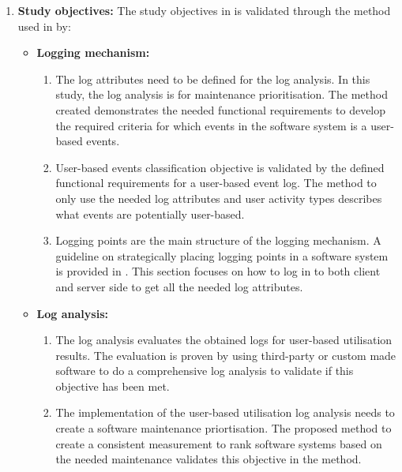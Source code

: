 \begin{enumerate}[label=\textbf{\Roman*.}]
	\item \textbf{Study objectives:} The study objectives in  is validated through the method used in  by:
		\begin{itemize}
			\item \textbf{Logging mechanism:}
			  \begin{enumerate}
				\item The log attributes need to be defined for the log analysis. In this study, the log analysis is for maintenance prioritisation. The method created demonstrates the needed functional requirements to develop the required criteria for which events in the software system is a user-based events.
				\item User-based events classification objective is validated by the defined functional requirements for a user-based event log. The method to only use the needed log attributes and user activity types describes what events are potentially user-based.
				\item Logging points are the main structure of the logging mechanism. A guideline on strategically placing logging points in a software system is provided in . This section focuses on how to log in to both client and server side to get all the needed log attributes.
			  \end{enumerate}

			\item \textbf{Log analysis:}
			 \begin{enumerate}
				\item The log analysis evaluates the obtained logs for user-based utilisation results. The evaluation is proven by using third-party or custom made software to do a comprehensive log analysis to validate if this objective has been met.
				\item The implementation of the user-based utilisation log analysis needs to create a software maintenance priortisation. The proposed method to create a consistent measurement to rank software systems based on the needed maintenance validates this objective in the method.
			 \end{enumerate}
		\end{itemize}


\end{enumerate}
